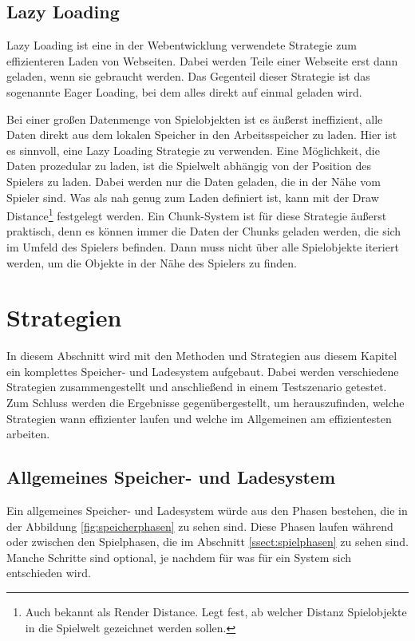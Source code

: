 \subsection{Lazy Loading} \label{ssect:lazyloading}
Lazy Loading ist eine in der Webentwicklung verwendete Strategie zum effizienteren Laden von Webseiten. Dabei werden Teile einer Webseite erst dann geladen, wenn sie gebraucht werden. Das Gegenteil dieser Strategie ist das sogenannte Eager Loading, bei dem alles direkt auf einmal geladen wird.\cite{cloudflareLazyLoad}

Bei einer großen Datenmenge von Spielobjekten ist es äußerst ineffizient, alle Daten direkt aus dem lokalen Speicher in den Arbeitsspeicher zu laden. Hier ist es sinnvoll, eine Lazy Loading Strategie zu verwenden. Eine Möglichkeit, die Daten prozedular zu laden, ist die Spielwelt abhängig von der Position des Spielers zu laden. Dabei werden nur die Daten geladen, die in der Nähe vom Spieler sind. Was als nah genug zum Laden definiert ist, kann mit der Draw Distance\footnote{Auch bekannt als Render Distance. Legt fest, ab welcher Distanz Spielobjekte in die Spielwelt gezeichnet werden sollen.\cite{nerdburglarsWhatDraw}} festgelegt werden. Ein Chunk-System ist für diese Strategie äußerst praktisch, denn es können immer die Daten der Chunks geladen werden, die sich im Umfeld des Spielers befinden. Dann muss nicht über alle Spielobjekte iteriert werden, um die Objekte in der Nähe des Spielers zu finden.




\section{Strategien}
In diesem Abschnitt wird mit den Methoden und Strategien aus diesem Kapitel ein komplettes Speicher- und Ladesystem aufgebaut. Dabei werden verschiedene Strategien zusammengestellt und anschließend in einem Testszenario getestet. Zum Schluss werden die Ergebnisse gegenübergestellt, um herauszufinden, welche Strategien wann effizienter laufen und welche im Allgemeinen am effizientesten arbeiten.

\subsection{Allgemeines Speicher- und Ladesystem}
Ein allgemeines Speicher- und Ladesystem würde aus den Phasen bestehen, die in der Abbildung \ref{fig:speicherphasen} zu sehen sind. Diese Phasen laufen während oder zwischen den Spielphasen, die im Abschnitt \ref{ssect:spielphasen} zu sehen sind. Manche Schritte sind optional, je nachdem für was für ein System sich entschieden wird.

